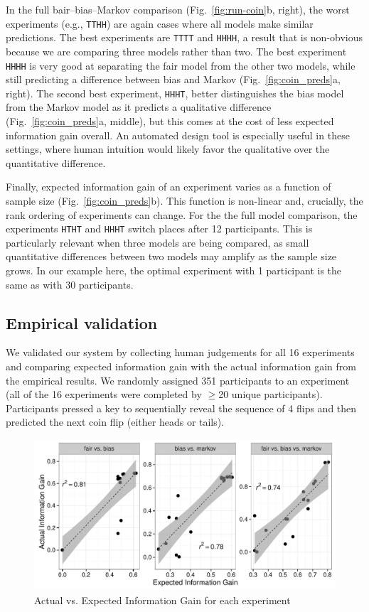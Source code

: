 \documentclass{article}
\begin{document}
In the full bair--bias--Markov comparison (Fig.~\ref{fig:run-coin}b, right), the worst experiments (e.g., \lstinline{TTHH}) are again cases where all models make similar predictions.
The best experiments are \lstinline{TTTT} and \lstinline{HHHH}, a result that is non-obvious because we are comparing three models rather than two.
The best experiment \lstinline{HHHH} is very good at separating the fair model from the other two models, while still predicting a difference between bias and Markov (Fig.~\ref{fig:coin_preds}a, right).
The second best experiment, \lstinline{HHHT}, better distinguishes the bias model from the Markov model as it predicts a qualitative difference (Fig.~\ref{fig:coin_preds}a, middle), but this comes at the cost of less expected information gain overall.
An automated design tool is especially useful in these settings, where human intuition would likely favor the qualitative over the quantitative difference.

Finally, expected information gain of an experiment varies as a function of sample size (Fig.~\ref{fig:coin_preds}b).
This function is non-linear and, crucially, the rank ordering of experiments can change.
For the the full model comparison, the experiments \lstinline{HTHT} and \lstinline{HHHT} switch places after 12 participants.
This is particularly relevant when three models are being compared, as small quantitative differences between two models may amplify as the sample size grows.
In our example here, the optimal experiment with 1 participant is the same as with 30 participants.


\subsection{Empirical validation}
We validated our system by collecting human judgements for all 16 experiments and comparing expected information gain with the actual information gain from the empirical results.
We randomly assigned 351 participants to an experiment (all of the 16 experiments were completed by $\geq$20 unique participants).
Participants pressed a key to sequentially reveal the sequence of 4 flips and then predicted the next coin flip (either heads or tails).

\begin{figure}[h]
  \centering
  \includegraphics[width=0.7\columnwidth]{img/coin_eig_aig_scatter_noText.pdf}
  \caption{Actual vs. Expected Information Gain for each experiment}
  \label{fig:aig_vs_eig}
\end{figure}
\end{document}
